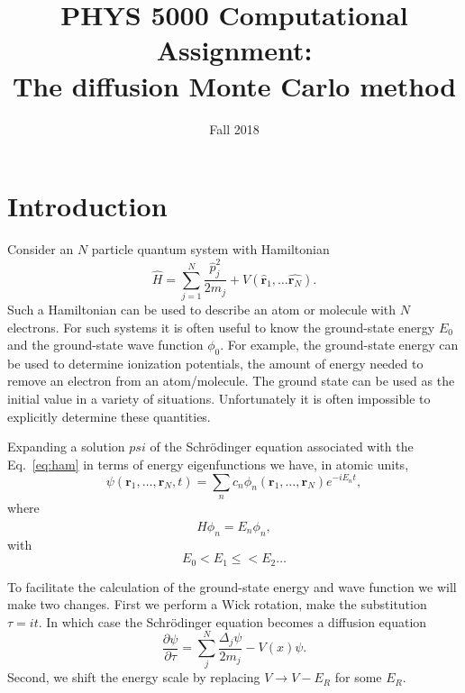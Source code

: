 \documentclass[letterpaper, 11 pt]{article}
\title{PHYS 5000 Computational Assignment:\\The diffusion Monte Carlo method}
\date{Fall 2018}
\author{}
\begin{document}
\maketitle

\section*{Introduction}

Consider an $N$ particle quantum system with Hamiltonian
%
\begin{equation} \label{eq:ham}
   \hat{H} = \sum\limits_{j = 1}^N \frac{\hat{p}^2_j}{2m_j} + V(\hat{\mathbf{r}}_1, \dots
   \hat{\mathbf{r}_N}).
\end{equation}
%
Such a Hamiltonian can be used to describe an atom or molecule with $N$ electrons. For such systems it
is often useful to know the ground-state energy $E_0$ and the ground-state wave function $\phi_0$. For
example, the ground-state energy can be used to determine ionization potentials, the amount of energy
needed to remove an electron from an atom/molecule. The ground state can be used as the initial value
in a variety of situations. Unfortunately it is often impossible to explicitly determine these
quantities.

Expanding a solution $psi$ of the Schr\"odinger equation associated with the Eq.~\eqref{eq:ham} in terms
of energy eigenfunctions we have, in atomic units,
%
\begin{equation} \label{eq:expansion}
   \psi(\mathbf{r}_1,\dots,\mathbf{r}_N,t) = \sum_n c_n \phi_n(\mathbf{r}_1,\dots,\mathbf{r}_N)
   e^{-i E_n t},
\end{equation}
%
where
%
\begin{equation}
   \hat{H} \phi_n = E_n \phi_n,
\end{equation}
%
with
%
\begin{equation}
   E_0 < E_1 \leq < E_2 \dots
\end{equation}

To facilitate the calculation of the ground-state energy and wave function we will make two changes.
First we perform a Wick rotation, make the substitution $\tau = it$. In which case the Schr\"odinger
equation becomes a diffusion equation
%
\begin{equation}
   \frac{\partial \psi}{\partial \tau} = \sum_j^N \frac{\Delta_j \psi}{2m_j} - V(x) \psi.
\end{equation}
%
Second, we shift the energy scale by replacing $V \rightarrow V - E_R$ for some $E_R$.
\end{document}

